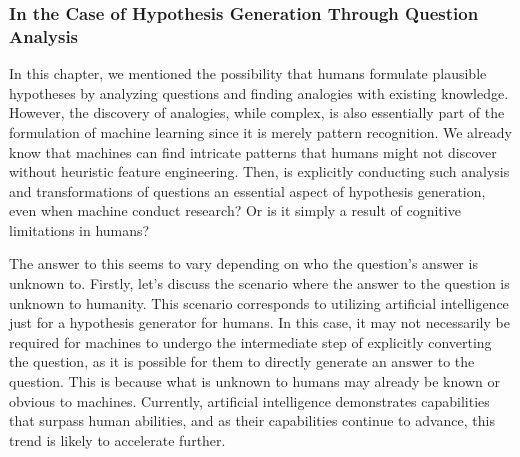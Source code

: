 \documentclass{book}
\begin{document}
\subsubsection{In the Case of Hypothesis Generation Through Question Analysis}

In this chapter, we mentioned the possibility that humans formulate plausible hypotheses by analyzing questions and finding analogies with existing knowledge. However, the discovery of analogies, while complex, is also essentially part of the formulation of machine learning since it is merely pattern recognition. We already know that machines can find intricate patterns that humans might not discover without heuristic feature engineering. Then, is explicitly conducting such analysis and transformations of questions an essential aspect of hypothesis generation, even when machine conduct research? Or is it simply a result of cognitive limitations in humans?

The answer to this seems to vary depending on who the question's answer is unknown to. Firstly, let's discuss the scenario where the answer to the question is unknown to humanity. This scenario corresponds to utilizing artificial intelligence just for a hypothesis generator for humans. In this case, it may not necessarily be required for machines to undergo the intermediate step of explicitly converting the question, as it is possible for them to directly generate an answer to the question. This is because what is unknown to humans may already be known or obvious to machines. Currently, artificial intelligence demonstrates capabilities that surpass human abilities, and as their capabilities continue to advance, this trend is likely to accelerate further.
\end{document}
